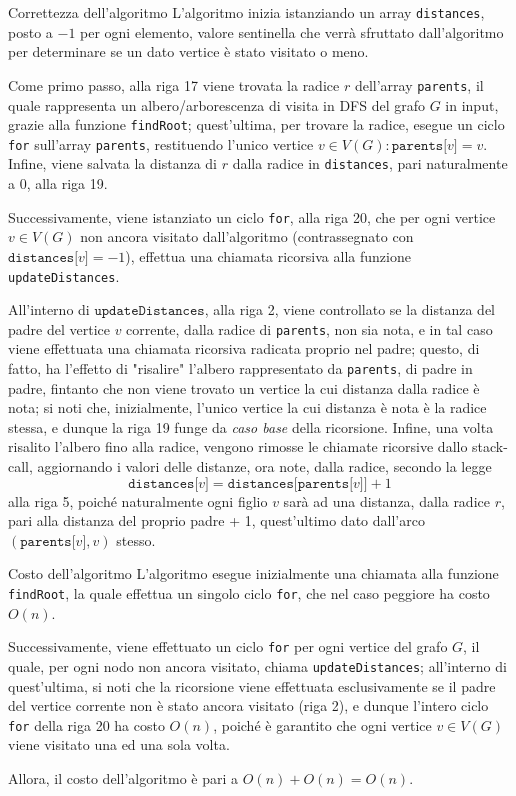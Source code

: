 \documentclass[a4paper, 12pt]{report}
\begin{document}
    \begin{framedobs}{Correttezza dell'algoritmo}
        L'algoritmo inizia istanziando un array \texttt{distances}, posto a $-1$ per ogni elemento, valore sentinella che verrà sfruttato dall'algoritmo per determinare se un dato vertice è stato visitato o meno.

        Come primo passo, alla riga 17 viene trovata la radice $r$ dell'array \texttt{parents}, il quale rappresenta un albero/arborescenza di visita in DFS del grafo $G$ in input, grazie alla funzione \texttt{findRoot}; quest'ultima, per trovare la radice, esegue un ciclo \texttt{for} sull'array \texttt{parents}, restituendo l'unico vertice $v \in V(G) : \texttt{parents[}v\texttt{]} = v$. Infine, viene salvata la distanza di $r$ dalla radice in \texttt{distances}, pari naturalmente a 0, alla riga 19.

        Successivamente, viene istanziato un ciclo \texttt{for}, alla riga 20, che per ogni vertice $v \in V(G)$ non ancora visitato dall'algoritmo (contrassegnato con $\texttt{distances[}v\texttt{]} = -1$), effettua una chiamata ricorsiva alla funzione \texttt{updateDistances}.

        All'interno di $\texttt{updateDistances}$, alla riga 2, viene controllato se la distanza del padre del vertice $v$ corrente, dalla radice di \texttt{parents}, non sia nota, e in tal caso viene effettuata una chiamata ricorsiva radicata proprio nel padre; questo, di fatto, ha l'effetto di "risalire" l'albero rappresentato da \texttt{parents}, di padre in padre, fintanto che non viene trovato un vertice la cui distanza dalla radice è nota; si noti che, inizialmente, l'unico vertice la cui distanza è nota è la radice stessa, e dunque la riga 19 funge da \textit{caso base} della ricorsione. Infine, una volta risalito l'albero fino alla radice, vengono rimosse le chiamate ricorsive dallo stack-call, aggiornando i valori delle distanze, ora note, dalla radice, secondo la legge $$\texttt{distances[}v\texttt{]} = \texttt{distances[parents[}v\texttt{]]} + 1$$ alla riga 5, poiché naturalmente ogni figlio $v$ sarà ad una distanza, dalla radice $r$, pari alla distanza del proprio padre + 1, quest'ultimo dato dall'arco $(\texttt{parents[}v\texttt{]}, v)$ stesso.
    \end{framedobs}

    \begin{framedobs}{Costo dell'algoritmo}
        L'algoritmo esegue inizialmente una chiamata alla funzione \texttt{findRoot}, la quale effettua un singolo ciclo \texttt{for}, che nel caso peggiore ha costo $O(n)$.

        Successivamente, viene effettuato un ciclo \texttt{for} per ogni vertice del grafo $G$, il quale, per ogni nodo non ancora visitato, chiama \texttt{updateDistances}; all'interno di quest'ultima, si noti che la ricorsione viene effettuata esclusivamente se il padre del vertice corrente non è stato ancora visitato (riga 2), e dunque l'intero ciclo \texttt{for} della riga 20 ha costo $O(n)$, poiché è garantito che ogni vertice $v \in V(G)$ viene visitato una ed una sola volta.

        Allora, il costo dell'algoritmo è pari a $O(n) + O(n) = O(n)$.
    \end{framedobs}
\end{document}
